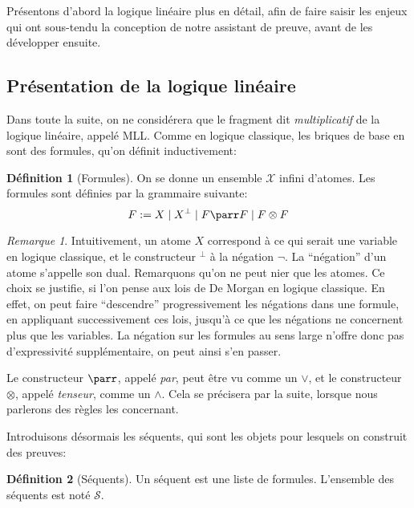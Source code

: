 \documentclass[11pt,a4paper]{article}
\theoremstyle{plain}
\theoremstyle{definition}
\newtheorem{definition}{Définition}
\theoremstyle{remark}
\newtheorem{remark}{Remarque}
\newcommand*{\orth}{^\perp}
\newcommand*{\tensor}{\otimes}
\newcommand*{\sequents}{\ensuremath{\mathcal{S}}}
\begin{document}
Présentons d'abord la logique linéaire plus en détail, afin de faire saisir les enjeux qui ont sous-tendu la conception de notre assistant de preuve, avant de les développer ensuite.

\subsection{Présentation de la logique linéaire}
Dans toute la suite, on ne considérera que le fragment dit \emph{multiplicatif} de la logique linéaire, appelé MLL. Comme en logique classique, les briques de base en sont des formules, qu'on définit inductivement:

\begin{definition}[Formules]
On se donne un ensemble $\mathcal{X}$ infini d'atomes. Les formules sont définies par la grammaire suivante:
\begin{equation*}
F := X \mid X\orth \mid F \parr F \mid F \tensor F
\end{equation*}
\end{definition}

\begin{remark}
    Intuitivement, un atome $X$ correspond à ce qui serait une variable en logique classique, et le constructeur $\orth$ à la négation $\neg$. La ``négation'' d'un atome s'appelle son dual. Remarquons qu'on ne peut nier que les atomes. Ce choix se justifie, si l'on pense aux lois de De Morgan en logique classique. En effet, on peut faire ``descendre'' progressivement les négations dans une formule, en appliquant successivement ces lois, jusqu'à ce que les négations ne concernent plus que les variables. La négation sur les formules au sens large n'offre donc pas d'expressivité supplémentaire, on peut ainsi s'en passer.

    Le constructeur $\parr$, appelé \emph{par}, peut être vu comme un $\lor$, et le constructeur $\tensor$, appelé \emph{tenseur}, comme un $\land$. Cela se précisera par la suite, lorsque nous parlerons des règles les concernant.
\end{remark}

Introduisons désormais les séquents, qui sont les objets pour lesquels on construit des preuves:

\begin{definition}[Séquents]
    Un séquent est une liste de formules. L'ensemble des séquents est noté $\sequents$.
\end{definition}
\end{document}
